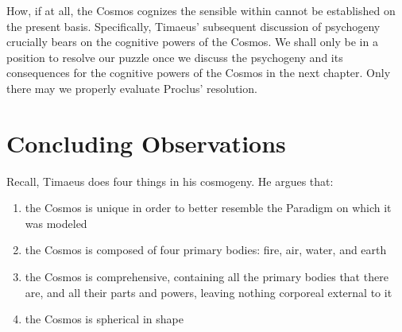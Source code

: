 How, if at all, the Cosmos cognizes the sensible within cannot be established on the present basis. Specifically, Timaeus' subsequent discussion of psychogeny crucially bears on the cognitive powers of the Cosmos. We shall only be in a position to resolve our puzzle once we discuss the psychogeny and its consequences for the cognitive powers of the Cosmos in the next chapter. Only there may we properly evaluate Proclus' resolution.


\section{Concluding Observations} %
\label{sec:concluding_observations_c}

Recall, Timaeus does four things in his cosmogeny. He argues that:
\begin{enumerate}[(1)]
	\item the Cosmos is unique in order to better resemble the Paradigm on which it was modeled
	\item the Cosmos is composed of four primary bodies: fire, air, water, and earth
	\item the Cosmos is comprehensive, containing all the primary bodies that there are, and all their parts and powers, leaving nothing corporeal external to it
	\item the Cosmos is spherical in shape
\end{enumerate}

